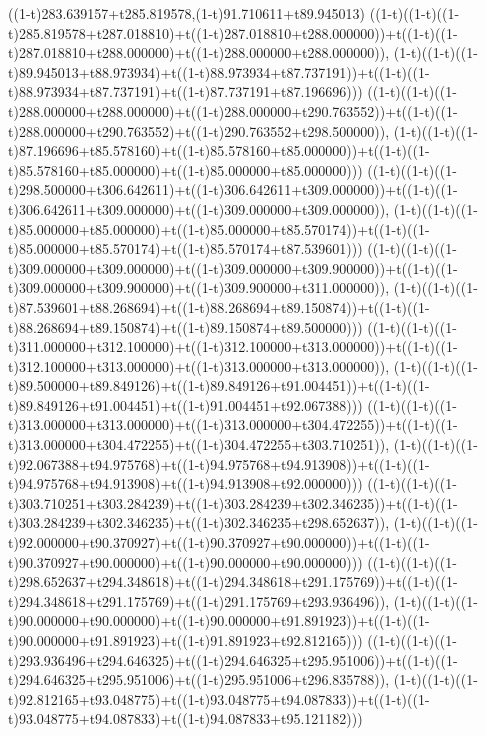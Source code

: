 ((1-t)283.639157+t285.819578,(1-t)91.710611+t89.945013)
((1-t)((1-t)((1-t)285.819578+t287.018810)+t((1-t)287.018810+t288.000000))+t((1-t)((1-t)287.018810+t288.000000)+t((1-t)288.000000+t288.000000)),                                     (1-t)((1-t)((1-t)89.945013+t88.973934)+t((1-t)88.973934+t87.737191))+t((1-t)((1-t)88.973934+t87.737191)+t((1-t)87.737191+t87.196696)))
((1-t)((1-t)((1-t)288.000000+t288.000000)+t((1-t)288.000000+t290.763552))+t((1-t)((1-t)288.000000+t290.763552)+t((1-t)290.763552+t298.500000)),                                     (1-t)((1-t)((1-t)87.196696+t85.578160)+t((1-t)85.578160+t85.000000))+t((1-t)((1-t)85.578160+t85.000000)+t((1-t)85.000000+t85.000000)))
((1-t)((1-t)((1-t)298.500000+t306.642611)+t((1-t)306.642611+t309.000000))+t((1-t)((1-t)306.642611+t309.000000)+t((1-t)309.000000+t309.000000)),                                     (1-t)((1-t)((1-t)85.000000+t85.000000)+t((1-t)85.000000+t85.570174))+t((1-t)((1-t)85.000000+t85.570174)+t((1-t)85.570174+t87.539601)))
((1-t)((1-t)((1-t)309.000000+t309.000000)+t((1-t)309.000000+t309.900000))+t((1-t)((1-t)309.000000+t309.900000)+t((1-t)309.900000+t311.000000)),                                     (1-t)((1-t)((1-t)87.539601+t88.268694)+t((1-t)88.268694+t89.150874))+t((1-t)((1-t)88.268694+t89.150874)+t((1-t)89.150874+t89.500000)))
((1-t)((1-t)((1-t)311.000000+t312.100000)+t((1-t)312.100000+t313.000000))+t((1-t)((1-t)312.100000+t313.000000)+t((1-t)313.000000+t313.000000)),                                     (1-t)((1-t)((1-t)89.500000+t89.849126)+t((1-t)89.849126+t91.004451))+t((1-t)((1-t)89.849126+t91.004451)+t((1-t)91.004451+t92.067388)))
((1-t)((1-t)((1-t)313.000000+t313.000000)+t((1-t)313.000000+t304.472255))+t((1-t)((1-t)313.000000+t304.472255)+t((1-t)304.472255+t303.710251)),                                     (1-t)((1-t)((1-t)92.067388+t94.975768)+t((1-t)94.975768+t94.913908))+t((1-t)((1-t)94.975768+t94.913908)+t((1-t)94.913908+t92.000000)))
((1-t)((1-t)((1-t)303.710251+t303.284239)+t((1-t)303.284239+t302.346235))+t((1-t)((1-t)303.284239+t302.346235)+t((1-t)302.346235+t298.652637)),                                     (1-t)((1-t)((1-t)92.000000+t90.370927)+t((1-t)90.370927+t90.000000))+t((1-t)((1-t)90.370927+t90.000000)+t((1-t)90.000000+t90.000000)))
((1-t)((1-t)((1-t)298.652637+t294.348618)+t((1-t)294.348618+t291.175769))+t((1-t)((1-t)294.348618+t291.175769)+t((1-t)291.175769+t293.936496)),                                     (1-t)((1-t)((1-t)90.000000+t90.000000)+t((1-t)90.000000+t91.891923))+t((1-t)((1-t)90.000000+t91.891923)+t((1-t)91.891923+t92.812165)))
((1-t)((1-t)((1-t)293.936496+t294.646325)+t((1-t)294.646325+t295.951006))+t((1-t)((1-t)294.646325+t295.951006)+t((1-t)295.951006+t296.835788)),                                     (1-t)((1-t)((1-t)92.812165+t93.048775)+t((1-t)93.048775+t94.087833))+t((1-t)((1-t)93.048775+t94.087833)+t((1-t)94.087833+t95.121182)))
